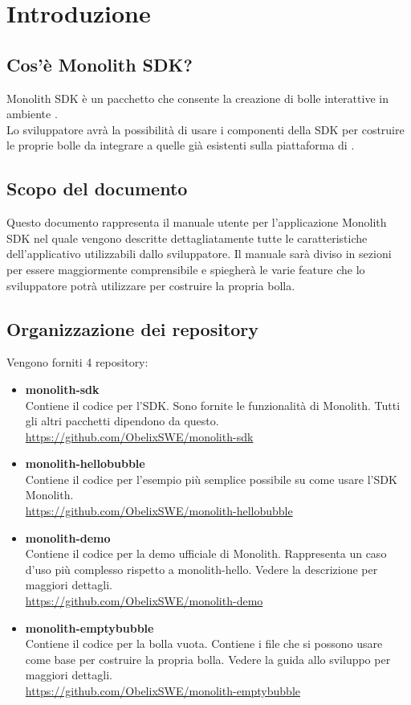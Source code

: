 \section{Introduzione}
\subsection{Cos'è Monolith SDK?}
Monolith SDK è un pacchetto  che consente la creazione di bolle interattive in ambiente .\\
Lo sviluppatore avrà la possibilità di usare i componenti della SDK per costruire le proprie bolle da integrare a quelle già esistenti sulla piattaforma di .
\subsection{Scopo del documento}
Questo documento rappresenta il manuale utente per l'applicazione Monolith SDK nel quale vengono descritte dettagliatamente tutte le caratteristiche dell'applicativo utilizzabili dallo sviluppatore.
Il manuale sarà diviso in sezioni per essere maggiormente comprensibile e spiegherà le varie feature che lo sviluppatore potrà utilizzare per costruire la propria bolla.
\subsection{Organizzazione dei repository}
Vengono forniti 4 repository:
\begin{itemize}
	\item \textbf{monolith-sdk} \\
	Contiene il codice per l'SDK. Sono fornite le funzionalità di Monolith. Tutti gli altri pacchetti dipendono da questo. \\
	\url{https://github.com/ObelixSWE/monolith-sdk}
	\item \textbf{monolith-hellobubble} \\
	Contiene il codice per l'esempio più semplice possibile su come usare l'SDK Monolith. \\
	\url{https://github.com/ObelixSWE/monolith-hellobubble}
	\item \textbf{monolith-demo} \\
	Contiene il codice per la demo ufficiale di Monolith. Rappresenta un caso d'uso più complesso rispetto a monolith-hello. Vedere la descrizione per maggiori dettagli. \\
	\url{https://github.com/ObelixSWE/monolith-demo}
	\item \textbf{monolith-emptybubble} \\
	Contiene il codice per la bolla vuota. Contiene i file che si possono usare come base per costruire la propria bolla. Vedere la guida allo sviluppo per maggiori dettagli. \\
	\url{https://github.com/ObelixSWE/monolith-emptybubble}
\end{itemize}

